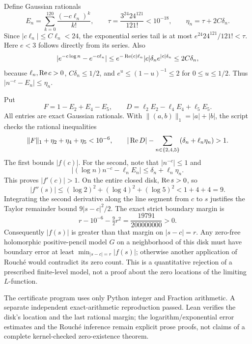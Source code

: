Define Gaussian rationals
\[
 E_n=\sum_{k=0}^{120}\frac{(-c\ell_n)^k}{k!},\qquad
 \tau=\frac{3^{24}24^{121}}{121!}<10^{-18},\qquad
 \eta_n=\tau+2C\delta_n.
\]
Since $|c\ell_n|\le C\ell_n<24$, the exponential series tail is
at most $e^{24}24^{121}/121!<\tau$. Here $e<3$ follows directly
from its series. Also
\[
 |e^{-c\log n}-e^{-c\ell_n}|
 \le e^{-\operatorname{Re}(c)\ell_n}|c|\delta_n e^{|c|\delta_n}
 \le2C\delta_n,
\]
because $\ell_n,\operatorname{Re} c>0$, $C\delta_n\le1/2$, and
$e^u\le(1-u)^{-1}\le2$ for $0\le u\le1/2$.
Thus $|n^{-c}-E_n|\le\eta_n$.

Put
\[
 F=1-E_2+E_4-E_5,\qquad
 D=\ell_2E_2-\ell_4E_4+\ell_5E_5.
\]
All entries are exact Gaussian rationals. With
$\|(a,b)\|_1=|a|+|b|$, the script checks the rational inequalities
\[
 \|F\|_1+\eta_2+\eta_4+\eta_5<10^{-6},\qquad
 |\operatorname{Re} D|-\sum_{n\in\{2,4,5\}}(\delta_n+\ell_n\eta_n)>1.
\]
The first bounds $|f(c)|$. For the second, note that $|n^{-c}|\le1$
and
\[
 |(\log n)n^{-c}-\ell_nE_n|
 \le\delta_n+\ell_n\eta_n.
\]
This proves $|f'(c)|>1$. On the entire closed disk, $\operatorname{Re} s>0$,
so
\[
 |f''(s)|\le(\log2)^2+(\log4)^2+(\log5)^2<1+4+4=9.
\]
Integrating the second derivative along the line segment from $c$ to $s$
justifies the Taylor remainder bound $9|s-c|^2/2$.
The exact strict boundary margin is
\[
 r-10^{-6}-\tfrac92r^2=\frac{19791}{200000000}>0.
\]
Consequently $|f(s)|$ is greater than that margin on $|s-c|=r$.
Any zero-free holomorphic positive-pencil model $G$ on a neighborhood of
this disk must have boundary error at least $\min_{|s-c|=r}|f(s)|$;
otherwise another application of Rouch\'e would contradict its zero count.
This is a quantitative rejection of a prescribed finite-level model,
not a proof about the zero locations of the limiting $L$-function.

The certificate program
uses only Python integer and Fraction arithmetic.
A separate independent exact-arithmetic reproduction passed. Lean verifies
the disk's location and the last rational margin; the logarithm/exponential
error estimates and the Rouch\'e inference remain explicit prose proofs,
not claims of a complete kernel-checked zero-existence theorem.

